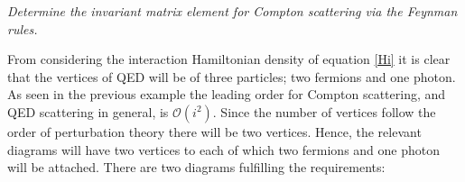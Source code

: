 \begin{example}
	\emph{Determine the invariant matrix element for Compton scattering via the Feynman rules.} \newline
	
	From considering the interaction Hamiltonian density of equation \eqref{Hi} it is clear that the vertices of QED will be of three particles; two fermions and one photon.	As seen in the previous example the leading order for Compton scattering, and QED scattering in general, is $\mathcal{O}(i^2)$. Since the number of vertices follow the order of perturbation theory there will be two vertices. Hence, the relevant diagrams will have two vertices to each of which two fermions and one photon will be attached. There are two diagrams fulfilling the requirements:
	\begin{center}
		
		
		\vspace{1cm}
		

\end{center}
\end{example}
